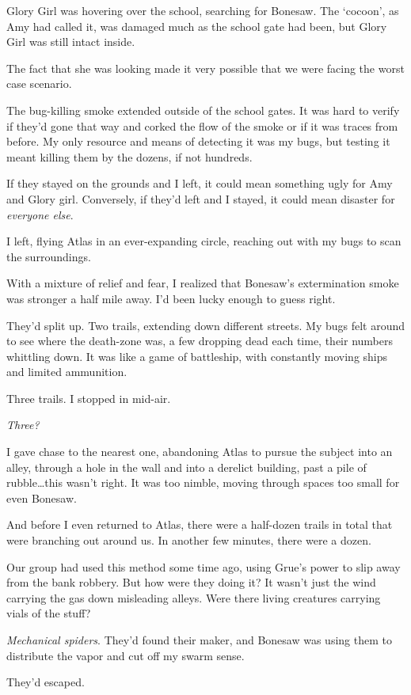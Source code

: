 Glory Girl was hovering over the school, searching for Bonesaw.  The `cocoon', as Amy had called it, was damaged much as the school gate had been, but Glory Girl was still intact inside.



The fact that she was looking made it very possible that we were facing the worst case scenario.



The bug-killing smoke extended outside of the school gates.  It was hard to verify if they'd gone that way and corked the flow of the smoke or if it was traces from before.  My only resource and means of detecting it was my bugs, but testing it meant killing them by the dozens, if not hundreds.



If they stayed on the grounds and I left, it could mean something ugly for Amy and Glory girl.  Conversely, if they'd left and I stayed, it could mean disaster for \emph{everyone else}.



I left, flying Atlas in an ever-expanding circle, reaching out with my bugs to scan the surroundings.



With a mixture of relief and fear, I realized that Bonesaw's extermination smoke was stronger a half mile away.  I'd been lucky enough to guess right.



They'd split up.  Two trails, extending down different streets.  My bugs felt around to see where the death-zone was, a few dropping dead each time, their numbers whittling down.  It was like a game of battleship, with constantly moving ships and limited ammunition.



Three trails.  I stopped in mid-air.



\emph{Three?}



I gave chase to the nearest one, abandoning Atlas to pursue the subject into an alley, through a hole in the wall and into a derelict building, past a pile of rubble\ldots this wasn't right.  It was too nimble, moving through spaces too small for even Bonesaw.



And before I even returned to Atlas, there were a half-dozen trails in total that were branching out around us.  In another few minutes, there were a dozen.



Our group had used this method some time ago, using Grue's power to slip away from the bank robbery.  But how were they doing it?  It wasn't just the wind carrying the gas down misleading alleys.  Were there living creatures carrying vials of the stuff?



\emph{Mechanical spiders}.  They'd found their maker, and Bonesaw was using them to distribute the vapor and cut off my swarm sense.



They'd escaped.





